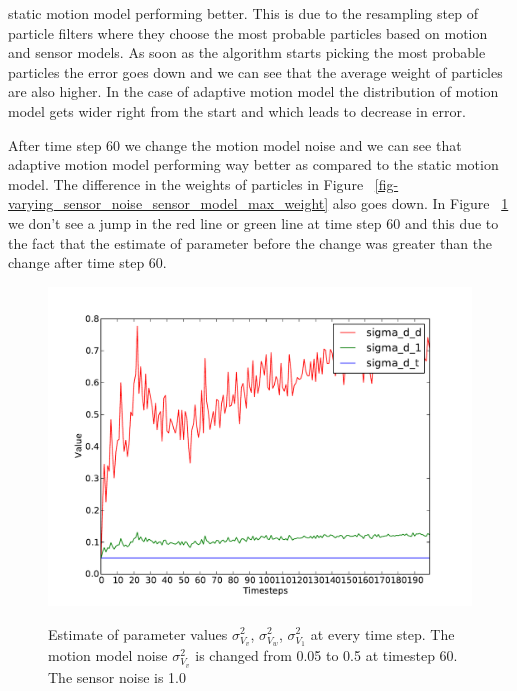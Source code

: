 \documentclass[12pt]{dalcsthesis}
\begin{document}
static motion model performing better. This is due to the resampling step of particle filters where they choose the most probable particles based on motion and sensor models. As soon as the algorithm starts picking the most probable particles the error goes down and we can see that the average weight of particles are also higher. In the case of adaptive motion model the distribution of motion model gets wider right from the start and which leads to decrease in error.

After time step 60 we change the motion model noise and we can see that adaptive motion model performing way better as compared to the static motion model. The difference in the weights of particles in Figure ~\ref{fig-varying_sensor_noise_sensor_model_max_weight} also goes down. In Figure ~\ref{fig-varying_sensor_noise_motion_model} we don't see a jump in the red line or green line at time step 60 and this due to the fact that the estimate of parameter before the change was greater than the change after time step 60. 

   
\begin{figure}
  \centering
     {\includegraphics[height = 3.0 in]{./plots/200_005_05_s_10_motion_model_trans.pdf}}
  \caption{\label{fig-varying_sensor_noise_motion_model} Estimate of parameter values $\sigma_{V_{v}}^{2}$, $\sigma_{V_{w}}^{2}$,  $\sigma_{V_{1}}^{2}$ at every time step. The motion model noise $\sigma_{V_{v}}^{2}$ is changed from 0.05 to 0.5 at timestep 60. The sensor noise is 1.0}
\end{figure}
\end{document}
